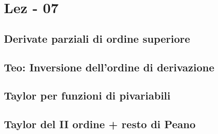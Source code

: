 \section{Lez - 07}
\subsection{Derivate parziali di ordine superiore}
\subsection{Teo: Inversione dell'ordine di derivazione}
\subsection{Taylor per funzioni di pi\acu variabili}
\subsection{Taylor del II ordine + resto di Peano}